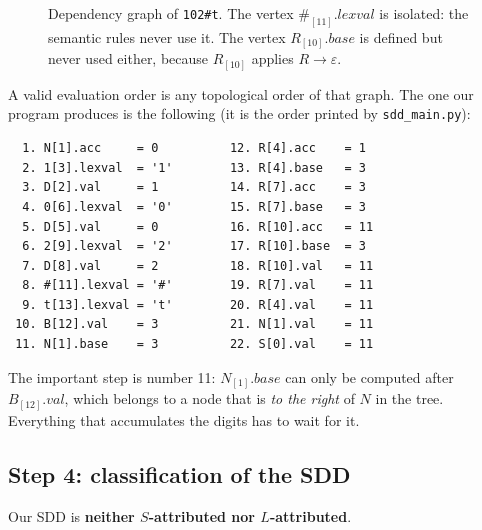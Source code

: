 \documentclass[11pt]{article}
\begin{document}
\begin{figure}[h]
\caption{Dependency graph of \texttt{102\#t}. The vertex
$\texttt{\#}_{[11]}.lexval$ is isolated: the semantic rules never use it. The vertex
$R_{[10]}.base$ is defined but never used either, because $R_{[10]}$ applies
$R \rightarrow \varepsilon$.}
\label{fig:graph}
\end{figure}

A valid evaluation order is any topological order of that graph. The one our program
produces is the following (it is the order printed by \texttt{sdd\_main.py}):

\begin{center}
\small
\begin{verbatim}
  1. N[1].acc     = 0          12. R[4].acc    = 1
  2. 1[3].lexval  = '1'        13. R[4].base   = 3
  3. D[2].val     = 1          14. R[7].acc    = 3
  4. 0[6].lexval  = '0'        15. R[7].base   = 3
  5. D[5].val     = 0          16. R[10].acc   = 11
  6. 2[9].lexval  = '2'        17. R[10].base  = 3
  7. D[8].val     = 2          18. R[10].val   = 11
  8. #[11].lexval = '#'        19. R[7].val    = 11
  9. t[13].lexval = 't'        20. R[4].val    = 11
 10. B[12].val    = 3          21. N[1].val    = 11
 11. N[1].base    = 3          22. S[0].val    = 11
\end{verbatim}
\end{center}

The important step is number 11: $N_{[1]}.base$ can only be computed after
$B_{[12]}.val$, which belongs to a node that is \emph{to the right} of $N$ in the tree.
Everything that accumulates the digits has to wait for it.

\subsection{Step 4: classification of the SDD}

Our SDD is \textbf{neither $S$-attributed nor $L$-attributed}.
\end{document}
